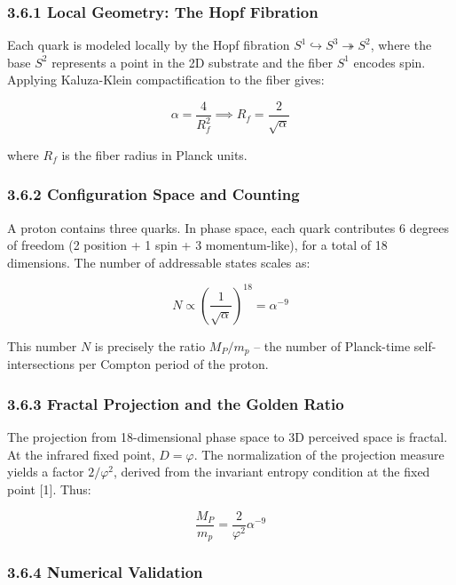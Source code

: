 \documentclass[
  11pt,
]{article}
\begin{document}
\subsubsection{3.6.1 Local Geometry: The Hopf
Fibration}\label{local-geometry-the-hopf-fibration}

Each quark is modeled locally by the Hopf fibration
\(S^1 \hookrightarrow S^3 \twoheadrightarrow S^2\), where the base
\(S^2\) represents a point in the 2D substrate and the fiber \(S^1\)
encodes spin. Applying Kaluza-Klein compactification to the fiber gives:

\[\alpha = \frac{4}{R_f^2} \implies R_f = \frac{2}{\sqrt{\alpha}}\]

where \(R_f\) is the fiber radius in Planck units.

\subsubsection{3.6.2 Configuration Space and
Counting}\label{configuration-space-and-counting}

A proton contains three quarks. In phase space, each quark contributes 6
degrees of freedom (2 position + 1 spin + 3 momentum-like), for a total
of 18 dimensions. The number of addressable states scales as:

\[N \propto \left(\frac{1}{\sqrt{\alpha}}\right)^{18} = \alpha^{-9}\]

This number \(N\) is precisely the ratio \(M_P/m_p\) -- the number of
Planck-time self-intersections per Compton period of the proton.

\subsubsection{3.6.3 Fractal Projection and the Golden
Ratio}\label{fractal-projection-and-the-golden-ratio}

The projection from 18-dimensional phase space to 3D perceived space is
fractal. At the infrared fixed point, \(D = \varphi\). The normalization
of the projection measure yields a factor \(2/\varphi^2\), derived from
the invariant entropy condition at the fixed point {[}1{]}. Thus:

\[\boxed{\frac{M_P}{m_p} = \frac{2}{\varphi^2} \alpha^{-9}}\]

\subsubsection{3.6.4 Numerical Validation}\label{numerical-validation}
\end{document}
